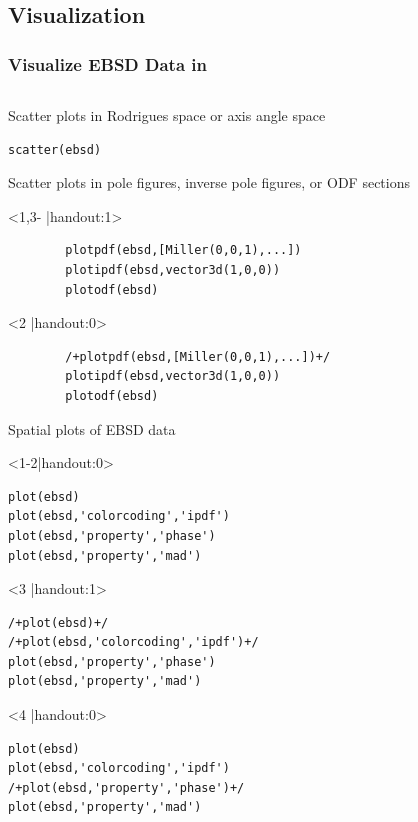 \subsection*{Visualization}

\begin{frame}[fragile]
  \frametitle{Visualize EBSD Data in \MTEX}

  \begin{columns}
    \begin{column}{8.5cm}

Scatter plots in Rodrigues space or axis angle space

\begin{lstlisting}
scatter(ebsd)
\end{lstlisting}

\pause

Scatter plots in pole figures, inverse pole figures, or ODF sections


\begin{onlyenv}<1,3- |handout:1>
\begin{lstlisting}
		plotpdf(ebsd,[Miller(0,0,1),...])
		plotipdf(ebsd,vector3d(1,0,0))
		plotodf(ebsd)
\end{lstlisting}
\end{onlyenv}

\begin{onlyenv}<2 |handout:0>
\begin{lstlisting}
		/+plotpdf(ebsd,[Miller(0,0,1),...])+/
		plotipdf(ebsd,vector3d(1,0,0))
		plotodf(ebsd)
\end{lstlisting}
\end{onlyenv}

\pause

Spatial plots of EBSD data

\begin{onlyenv}<1-2|handout:0>
\begin{lstlisting}
plot(ebsd)
plot(ebsd,'colorcoding','ipdf')
plot(ebsd,'property','phase')
plot(ebsd,'property','mad')
\end{lstlisting}
\end{onlyenv}

\begin{onlyenv}<3 |handout:1>
\begin{lstlisting}
/+plot(ebsd)+/
/+plot(ebsd,'colorcoding','ipdf')+/
plot(ebsd,'property','phase')
plot(ebsd,'property','mad')
\end{lstlisting}
\end{onlyenv}

\begin{onlyenv}<4 |handout:0>
\begin{lstlisting}
plot(ebsd)
plot(ebsd,'colorcoding','ipdf')
/+plot(ebsd,'property','phase')+/
plot(ebsd,'property','mad')
\end{lstlisting}
\end{onlyenv}


\end{column}
\end{columns}
\end{frame}
